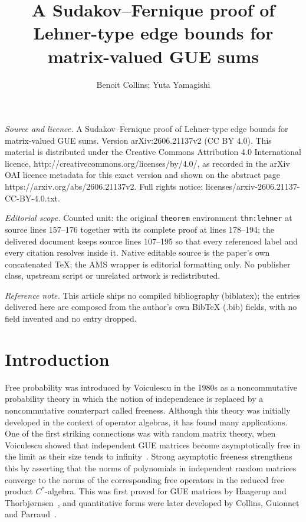 \documentclass[10pt,a4paper]{amsart}
\begin{document}
\title[A Sudakov--Fernique proof of Lehner-type edge bounds for mat]{A Sudakov--Fernique proof of Lehner-type edge bounds for matrix-valued GUE sums}
\author{Benoit Collins; Yuta Yamagishi}
\date{}
\maketitle
\noindent\emph{Source and licence.} A Sudakov--Fernique proof of Lehner-type edge bounds for matrix-valued GUE sums. Version arXiv:2606.21137v2 (CC BY 4.0). This material is distributed under the Creative Commons Attribution 4.0 International licence, http://creativecommons.org/licenses/by/4.0/, as recorded in the arXiv OAI licence metadata for this exact version and shown on the abstract page https://arxiv.org/abs/2606.21137v2. Full rights notice: licenses/arxiv-2606.21137-CC-BY-4.0.txt.\par\smallskip
\noindent\textit{Editorial scope.} Counted unit: the original \texttt{theorem} environment \texttt{thm:lehner} at source lines 157--176 together with its complete proof at lines 178--194; the delivered document keeps source lines 107--195 so that every referenced label and every citation resolves inside it. Native editable source is the paper's own concatenated TeX; the AMS wrapper is editorial formatting only. No publisher class, upstream script or unrelated artwork is redistributed.
\par\smallskip\noindent\textit{Reference note.} This article ships no compiled bibliography (biblatex); the entries delivered here are composed from the author's own BibTeX (.bib) fields, with no field invented and no entry dropped.
\section{Introduction}

Free probability was introduced by Voiculescu in the 1980s as a noncommutative probability theory in which the notion of independence is replaced by a noncommutative counterpart called freeness.  Although this theory was initially developed in the context of operator algebras, it has found many applications.
One of the first striking connections was with random matrix theory, when
Voiculescu showed that independent GUE matrices become asymptotically free in the limit as their size tends to infinity~\cite{Voiculescu1991}.
Strong asymptotic freeness strengthens this by asserting that the norms of polynomials in independent random matrices converge to the norms of the corresponding free operators in the reduced free product $C^*$-algebra.  This was first proved for GUE matrices by Haagerup and Thorbj\o rnsen~\cite{HaagerupThorbjornsen}, and quantitative forms were later developed by Collins, Guionnet and Parraud~\cite{CollinsParraudGuionnet}.
\end{document}
